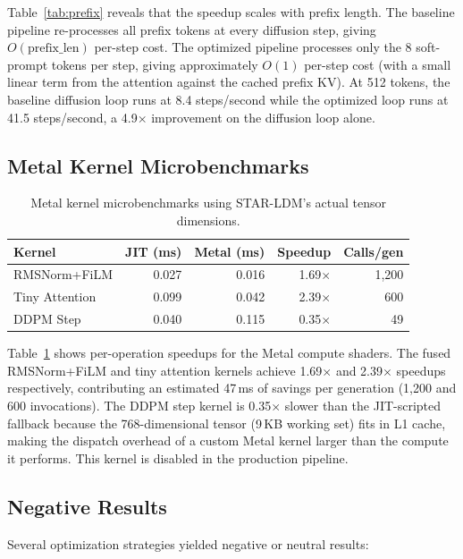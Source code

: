 \documentclass[sigconf,authordraft]{acmart}
\begin{document}
Table~\ref{tab:prefix} reveals that the speedup scales with prefix length. The baseline pipeline re-processes all prefix tokens at every diffusion step, giving $O(\text{prefix\_len})$ per-step cost. The optimized pipeline processes only the 8 soft-prompt tokens per step, giving approximately $O(1)$ per-step cost (with a small linear term from the attention against the cached prefix KV). At 512 tokens, the baseline diffusion loop runs at 8.4 steps/second while the optimized loop runs at 41.5 steps/second, a 4.9$\times$ improvement on the diffusion loop alone.

\subsection{Metal Kernel Microbenchmarks}

\begin{table}[t]
\caption{Metal kernel microbenchmarks using STAR-LDM's actual tensor dimensions.}
\label{tab:kernels}
\begin{tabular}{lrrrr}
\toprule
Kernel & JIT (ms) & Metal (ms) & Speedup & Calls/gen \\
\midrule
RMSNorm+FiLM & 0.027 & 0.016 & 1.69$\times$ & 1{,}200 \\
Tiny Attention & 0.099 & 0.042 & 2.39$\times$ & 600 \\
DDPM Step & 0.040 & 0.115 & 0.35$\times$ & 49 \\
\bottomrule
\end{tabular}
\end{table}

Table~\ref{tab:kernels} shows per-operation speedups for the Metal compute shaders. The fused RMSNorm+FiLM and tiny attention kernels achieve 1.69$\times$ and 2.39$\times$ speedups respectively, contributing an estimated 47\,ms of savings per generation (1{,}200 and 600 invocations). The DDPM step kernel is 0.35$\times$ slower than the JIT-scripted fallback because the 768-dimensional tensor (9\,KB working set) fits in L1 cache, making the dispatch overhead of a custom Metal kernel larger than the compute it performs. This kernel is disabled in the production pipeline.

\subsection{Negative Results}
\label{sec:negative}

Several optimization strategies yielded negative or neutral results:
\end{document}
